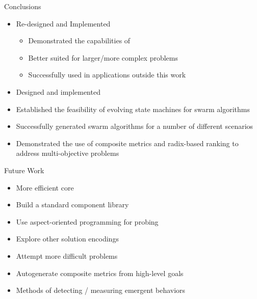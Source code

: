 \begin{slide}{Conclusions}
  \begin{itemize}
  \item Re-designed and Implemented \SWEEP
    \begin{itemize}
    \item Demonstrated the capabilities of \SWEEP
    \item Better suited for larger/more complex problems
    \item Successfully used in applications outside this work
    \end{itemize}
    
  \item Designed and implemented \ECS
  \item Established the feasibility of evolving state machines for swarm algorithms
  \item Successfully generated swarm algorithms for a number of different scenarios
  \item Demonstrated the use of composite metrics and radix-based ranking to address multi-objective problems
  \end{itemize}
\end{slide}


\begin{slide}{Future Work}
  \begin{itemize}
    \itemsep=2ex
  \item More efficient \SWEEP core
  \item Build a standard \SWEEP component library
  \item Use aspect-oriented programming for probing
  \item Explore other solution encodings
  \item Attempt more difficult problems
  \item Autogenerate composite metrics from high-level goals
  \item Methods of detecting / measuring emergent behaviors
  \end{itemize}
\end{slide}


